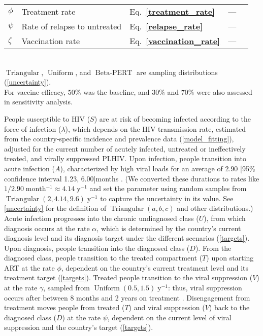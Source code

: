 \documentclass{article}
\renewcommand{\eqref}[1]{\textbf{\ref{#1}}}
\DeclareMathOperator{\Uniform}{Uniform}
\DeclareMathOperator{\Triangular}{Triangular}
\DeclareMathOperator{\BetaPERT}{Beta-PERT}
\begin{document}
\begin{table}
\begin{tabularx}{\textwidth}{lXlll}
    $\phi$ & Treatment rate & Eq.~\eqref{treatment_rate} & ---
    \\
    $\psi$ & Rate of relapse to untreated & Eq.~\eqref{relapse_rate} & ---
    \\
    $\zeta$ & Vaccination rate & Eq.~\eqref{vaccination_rate} & ---
    \\ \hline
  \end{tabularx}
  \\[5pt]
  $\Triangular$, $\Uniform$, and $\BetaPERT$ are sampling
  distributions (\autoref{uncertainty}).
  \\
  For vaccine efficacy, $50\%$ was the baseline, and $30\%$ and $70\%$
  were also assessed in sensitivity analysis.
\end{table}

People susceptible to HIV ($S$) are at risk of becoming infected
according to the force of infection ($\lambda$), which depends on the
HIV transmission rate, estimated from the country-specific incidence
and prevalence data (\autoref{model_fitting}), adjusted for the
current number of acutely infected, untreated or ineffectively
treated, and virally suppressed PLHIV.  Upon infection, people
transition into acute infection ($A$), characterized by high viral
loads for an average of 2.90 [95\% confidence interval 1.23,
6.00]\;months \cite{Hollingsworth2008-iy}.  (We converted these
durations to rates like $1 / 2.90\;\text{month$^{-1}$} \approx
4.14\;\text{y$^{-1}$}$ and set the parameter using random samples from
$\Triangular(2, 4.14, 9.6)\;\text{y$^{-1}$}$ to capture the
uncertainty in its value.  See \autoref{uncertainty} for the
definition of $\Triangular(a, b, c)$ and other distributions.)  Acute
infection progresses into the chronic undiagnosed class ($U$), from
which diagnosis occurs at the rate $\alpha$, which is determined by
the country's current diagnosis level and its diagnosis target under
the different scenarios (\autoref{targets}).  Upon diagnosis, people
transition into the diagnosed class ($D$).  From the diagnosed class,
people transition to the treated compartment ($T$) upon starting ART
at the rate $\phi$, dependent on the country's current treatment level
and its treatment target (\autoref{targets}).  Treated people
transition to the viral suppression ($V$) at the rate $\gamma$,
sampled from $\Uniform(0.5, 1.5)\;\text{y$^{-1}$}$: thus, viral
suppression occurs after between 8 months and 2 years on
treatment \cite{Currie2009-yz}.  Disengagement from treatment moves
people from treated ($T$) and viral suppression ($V$) back to the
diagnosed class ($D$) at the rate $\psi$, dependent on the current
level of viral suppression and the country's target
(\autoref{targets}).
\end{document}

